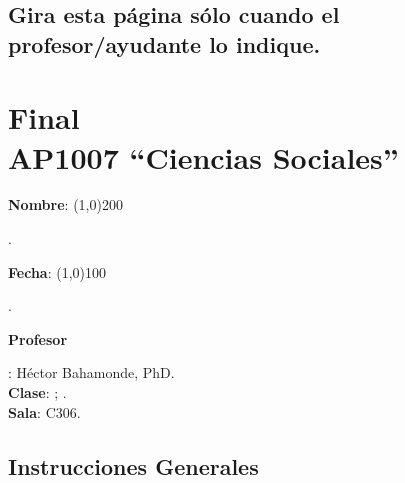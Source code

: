 \documentclass{article}
\begin{document}
\subsection*{Gira esta p\'agina s\'olo cuando el profesor/ayudante lo indique.}

\clearpage
\newpage

{\centering\section*{Final\\AP1007 ``Ciencias Sociales''}}

{\vspace{.5cm}\raggedright{\bf Nombre}: \line(1,0){200}}. %
{\vspace{.5cm}\hspace{4.5cm}\raggedright{\bf Fecha}: \line(1,0){100}}. %


{\vspace{.5cm}\raggedright \bf Profesor}: H\'ector Bahamonde, PhD.\\
{\bf Clase}: {\unskip}; {\unskip}.\\
{\bf Sala}: C306.


\vspace{0.5cm}\subsection*{Instrucciones Generales}
\end{document}
